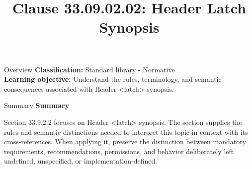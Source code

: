 \documentclass[10pt,letterpaper]{article}
\title{Clause 33.09.02.02: Header Latch Synopsis}
\author{}
\date{}
\begin{document}
\maketitle
\begin{CornellOverviewBox}{Overview}
\textbf{Classification:} Standard library - Normative\\[2pt]
\textbf{Learning objective:} Understand the rules, terminology, and semantic consequences associated with Header <latch> synopsis.
\end{CornellOverviewBox}\begin{CornellSummaryBox}{Summary}
{\sffamily\bfseries\color{Accent} Summary}\par\vspace{3pt}Section 33.9.2.2 focuses on Header <latch> synopsis. The section supplies the rules and semantic distinctions needed to interpret this topic in context with its cross-references. When applying it, preserve the distinction between mandatory requirements, recommendations, permissions, and behavior deliberately left undefined, unspecified, or implementation-defined.
\end{CornellSummaryBox}
\end{document}
